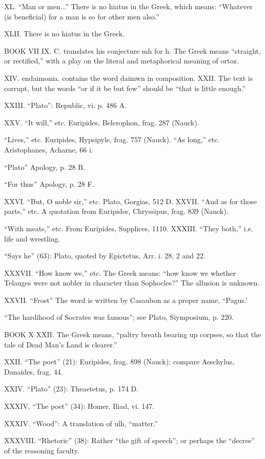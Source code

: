 XL. ``Man or men...'' There is no hiatus in the Greek, which means:
``Whatever (is beneficial) for a man is so for other men also.''

XLII. There is no hiatus in the Greek.

BOOK VII IX. C. translates his conjecture mh for h. The Greek means
``straight, or rectified,'' with a play on the literal and metaphorical
meaning of ortoz.

XIV. endaimonia. contains the word daimwn in composition. XXII. The text
is corrupt, but the words ``or if it be but few'' should be ``that is little
enough.''

XXIII. ``Plato'': Republic, vi. p. 486 A.

XXV. ``It will,'' etc. Euripides, Belerophon, frag. 287 (Nauck).

``Lives,'' etc. Euripides, Hypsipyle, frag. 757 (Nauck). ``As long,'' etc.
Aristophanes, Acharne, 66 i.

``Plato'' Apology, p. 28 B.

``For thus'' Apology, p. 28 F.

XXVI. ``But, O noble sir,'' etc. Plato, Gorgias, 512 D. XXVII. ``And as for
those parts,'' etc. A quotation from Euripides, Chryssipus, frag. 839
(Nauck).

``With meats,'' etc. From Euripides, Supplices, 1110. XXXIII. ``They both,''
i.e. life and wrestling.

``Says he'' (63): Plato, quoted by Epictetus, Arr. i. 28, 2 and 22.

XXXVII. ``How know we,'' etc. The Greek means: ``how know we whether Telauges
were not nobler in character than Sophocles?'' The allusion is unknown.

XXVII. ``Frost'' The word is written by Casaubon as a proper name, ``Pagus.'

``The hardihood of Socrates was famous''; see Plato, Siymposium, p. 220.

BOOK X XXII. The Greek means, ``paltry breath bearing up corpses, so that
the tale of Dead Man's Land is clearer.''

XXII. ``The poet'' (21): Euripides, frag. 898 (Nauck); compare Aeschylus,
Danaides, frag. 44.

XXIV. ``Plato'' (23): Theaetetus, p. 174 D.

XXXIV. ``The poet'' (34): Homer, Iliad, vi. 147.

XXXIV. ``Wood'': A translation of ulh, ``matter.''

XXXVIII. ``Rhetoric'' (38): Rather ``the gift of speech''; or perhaps the
``decree'' of the reasoning faculty.

